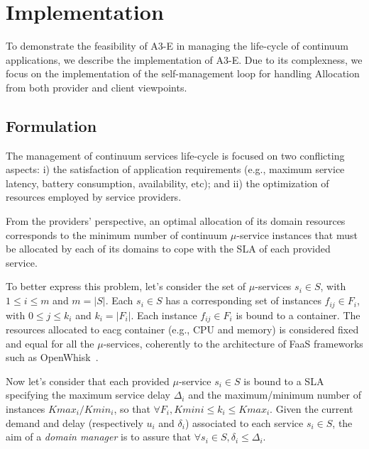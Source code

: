 \section{Implementation}\label{sec:implementation}


To demonstrate the feasibility of A3-E in managing the life-cycle of continuum applications, we describe the implementation of A3-E. Due to its complexness, we focus on the implementation of the self-management loop for handling Allocation from both provider and client viewpoints. 

\subsection{Formulation}

The management of continuum services life-cycle is focused on two conflicting aspects: i) the satisfaction of application requirements (e.g., maximum service latency, battery consumption, availability, etc); and ii) the optimization of resources employed by service providers. 

From the providers' perspective, an optimal allocation of its domain resources corresponds to the minimum number of continuum $\mu$-service instances that must be allocated by each of its domains to cope with the SLA of each provided service.%

To better express this problem, let's consider the set of $\mu$-services $s_i \in S$, with $1 \le i \le m$ and $m = |S|$. Each $s_i \in S$ has a corresponding set of instances $f_{ij} \in F_i$, with $0 \le j \le k_i$ and $k_i = |F_i|$. Each instance $f_{ij} \in F_i$ is bound to a container. The resources allocated to eacg container (e.g., CPU and memory) is considered fixed and equal for all the $\mu$-services, coherently to the architecture of FaaS frameworks such as OpenWhisk~\cite{OpenWhisk}. 

Now let's consider that each provided $\mu$-service $s_i \in S$ is bound to a SLA specifying the maximum service delay $\Delta_i$ and the maximum/minimum number of instances $Kmax_{i}/Kmin_{i}$, so that $\forall F_i, Kmin{i} \le k_i \le Kmax_{i}$. %
Given the current demand and delay (respectively $u_i$ and $\delta_i$) associated to each service $s_i \in S$, the aim of a \textit{domain manager} is to assure that $\forall s_i \in S, \delta_i \le \Delta_i$. 

